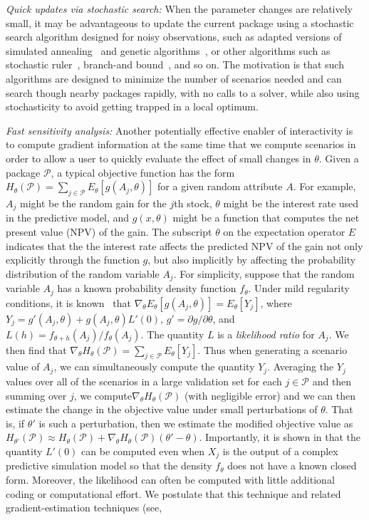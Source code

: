 \documentclass[11pt]{article}
\begin{document}
\smallskip\textit{Quick updates via stochastic search:} When the parameter changes are relatively small, it may be advantageous to update the current package using a stochastic search algorithm designed for noisy observations, such as adapted versions of simulated annealing~\cite{alkhamis2004simulation,alrefaei1999simulated} and genetic algorithms~\cite{xiao2014simulation}, or other algorithms such as stochastic ruler~\cite{alrefaei2005discrete}, 
branch-and bound~\cite{norkin1998branch}, and so on. The motivation is that such algorithms are designed to minimize the number of scenarios needed and can search though nearby packages rapidly, with no calls to a solver, while also using stochasticity to avoid getting trapped in a local optimum.

\smallskip\textit{Fast sensitivity analysis:} Another potentially effective enabler of interactivity is to compute gradient information at the same time that we compute scenarios in order to allow a user to quickly evaluate the effect of small changes in $\theta$. Given a package $\mathcal P$, a typical objective function has the form $H_\theta(\mathcal{P})=\sum_{j\in\mathcal{P}}E_\theta[g(A_j,\theta)]$ for a given random attribute $A$. For example, $A_j$ might be the random gain for the $j$th stock, $\theta$ might be the interest rate used in the predictive model, and $g(x,\theta)$ might be a function that computes the net present value (NPV) of the gain. The subscript $\theta$ on the expectation operator $E$ indicates that the the interest rate affects the predicted NPV of the gain not only explicitly through the function $g$, but also implicitly by affecting the probability distribution of the random variable $A_j$. For simplicity, suppose that the random variable $A_j$ has a known probability density function $f_\theta$. Under mild regularity conditions, it is known~\cite{glynn1990likelihood} that $\nabla_\theta E_\theta[g(A_j,\theta)]=E_\theta[Y_j]$, where $Y_j=g'(A_j,\theta)+g(A_j,\theta)L'(0)$, $g'=\partial g/\partial \theta$, and $L(h)= f_{\theta+h}(A_j)/f_\theta(A_j)$. The quantity $L$ is a \emph{likelihood ratio} for $A_j$. We then find that $\nabla_\theta H_\theta(\mathcal{P}) =\sum_{j\in\mathcal{P}}E_\theta[Y_j]$. Thus when generating a scenario value of $A_j$, we can simultaneously compute the quantity $Y_j$. Averaging the $Y_j$ values over all of the scenarios in a large validation set for each $j\in\mathcal{P}$ and then summing over $j$, we compute$\nabla_\theta H_\theta(\mathcal{P})$ (with negligible error) and we can then estimate the change in the objective value under small perturbations of $\theta$. That is, if $\theta'$ is such a perturbation, then we estimate the modified objective value as $H_{\theta'}(\mathcal{P})\approx H_\theta(\mathcal{P})+ \nabla_\theta H_\theta(\mathcal{P})(\theta'-\theta)$. Importantly, it is shown in \cite{glynn1990likelihood} that the quantity $L'(0)$ can be computed even when $X_j$ is the output of a complex predictive simulation model so that the density $f_\theta$ does not have a known closed form. Moreover, the likelihood can often be computed with little additional coding or computational effort. We postulate that this technique and related gradient-estimation techniques (see, 
\end{document}
